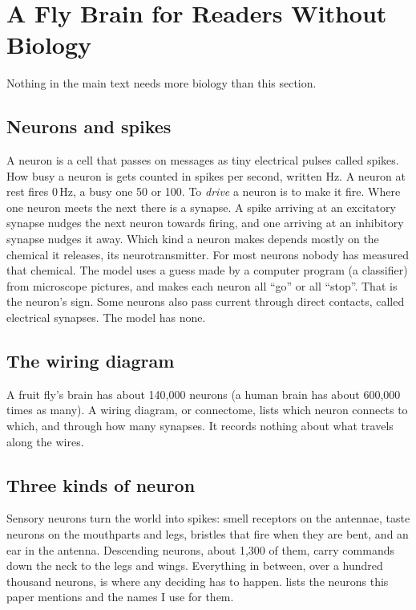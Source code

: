 \section{A Fly Brain for Readers Without Biology}
\label{sec:guide}

Nothing in the main text needs more biology than this section.

\subsection*{Neurons and spikes}

A neuron is a cell that passes on messages as tiny electrical pulses called spikes. How busy a neuron is gets counted in spikes per second, written Hz. A neuron at rest fires 0\,Hz, a busy one 50 or 100. To \emph{drive} a neuron is to make it fire. Where one neuron meets the next there is a synapse. A spike arriving at an excitatory synapse nudges the next neuron towards firing, and one arriving at an inhibitory synapse nudges it away. Which kind a neuron makes depends mostly on the chemical it releases, its neurotransmitter. For most neurons nobody has measured that chemical. The model uses a guess made by a computer program (a classifier) from microscope pictures, and makes each neuron all ``go'' or all ``stop''. That is the neuron's sign. Some neurons also pass current through direct contacts, called electrical synapses. The model has none.

\subsection*{The wiring diagram}

A fruit fly's brain has about 140{,}000 neurons (a human brain has about 600{,}000 times as many). A wiring diagram, or connectome, lists which neuron connects to which, and through how many synapses. It records nothing about what travels along the wires.

\subsection*{Three kinds of neuron}

Sensory neurons turn the world into spikes: smell receptors on the antennae, taste neurons on the mouthparts and legs, bristles that fire when they are bent, and an ear in the antenna. Descending neurons, about 1{,}300 of them, carry commands down the neck to the legs and wings. Everything in between, over a hundred thousand neurons, is where any deciding has to happen.  lists the neurons this paper mentions and the names I use for them.

